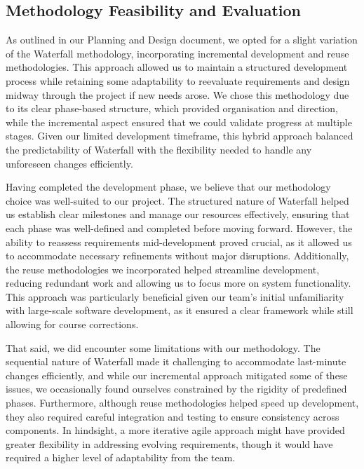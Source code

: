 \documentclass{article}
\begin{document}
    \subsection{Methodology Feasibility and Evaluation}

    As outlined in our Planning and Design document, we opted for a slight variation of the Waterfall methodology, incorporating incremental development and reuse methodologies. This approach allowed us to maintain a structured 
    development process while retaining some adaptability to reevaluate requirements and design midway through the project if new needs arose. We chose this methodology due to its clear phase-based structure, which provided 
    organisation and direction, while the incremental aspect ensured that we could validate progress at multiple stages. Given our limited development timeframe, this hybrid approach balanced the predictability of Waterfall
    with the flexibility needed to handle any unforeseen changes efficiently.

    Having completed the development phase, we believe that our methodology choice was well-suited to our project. The structured nature of Waterfall helped us establish clear milestones and manage our resources effectively, 
    ensuring that each phase was well-defined and completed before moving forward. However, the ability to reassess requirements mid-development proved crucial, as it allowed us to accommodate necessary refinements without major 
    disruptions. Additionally, the reuse methodologies we incorporated helped streamline development, reducing redundant work and allowing us to focus more on system functionality. This approach was particularly beneficial given 
    our team’s initial unfamiliarity with large-scale software development, as it ensured a clear framework while still allowing for course corrections.

    That said, we did encounter some limitations with our methodology. The sequential nature of Waterfall made it challenging to accommodate last-minute changes efficiently, and while our incremental approach mitigated some of these 
    issues, we occasionally found ourselves constrained by the rigidity of predefined phases. Furthermore, although reuse methodologies helped speed up development, they also required careful integration and testing to ensure consistency 
    across components. In hindsight, a more iterative agile approach might have provided greater flexibility in addressing evolving requirements, though it would have required a higher level of adaptability from the team.
\end{document}
